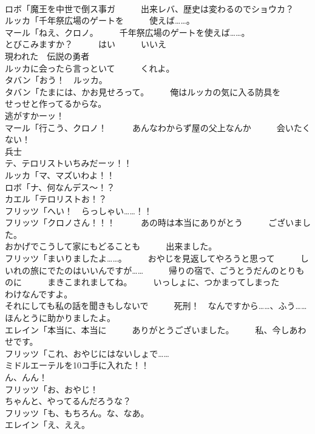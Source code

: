 \documentclass[8pt]{extreport}
\begin{document}
\begin{CJK}{UTF8}{min}
\\	ロボ「魔王を中世で倒ス事ガ　　　出来レバ、歴史は変わるのでショウカ？	
\\	ルッカ「千年祭広場のゲートを　　　使えば……。	
\\	マール「ねえ、クロノ。　　　千年祭広場のゲートを使えば……。	
\\	とびこみますか？　　　はい　　　いいえ	
\\	現われた　伝説の勇者	
\\	ルッカに会ったら言っといて　　　くれよ。	
\\	タバン「おう！　ルッカ。	
\\	タバン「たまには、かお見せろって。　　　俺はルッカの気に入る防具を　　　せっせと作ってるからな。	
\\	逃がすかーッ！	
\\	マール「行こう、クロノ！　　　あんなわからず屋の父上なんか　　　会いたくない！	
\\	兵士
\\	テ、テロリストいちみだーッ！！	
\\	ルッカ「マ、マズいわよ！！	
\\	ロボ「ナ、何なんデス～！？	
\\	カエル「テロリストお！？	
\\	フリッツ「へい！　らっしゃい……！！	
\\	フリッツ「クロノさん！！！　　　あの時は本当にありがとう　　　ございました。	
\\	おかげでこうして家にもどることも　　　出来ました。	
\\	フリッツ「まいりましたよ……。　　　おやじを見返してやろうと思って　　　しいれの旅にでたのはいいんですが……　　　帰りの宿で、ごうとうだんのとりものに　　　まきこまれましてね。　　　いっしょに、つかまってしまった　　　わけなんですよ。	
\\	それにしても私の話を聞きもしないで　　　死刑！　なんですから……、ふう……　　　ほんとうに助かりましたよ。	
\\	エレイン「本当に、本当に　　　ありがとうございました。　　　私、今しあわせです。	
\\	フリッツ「これ、おやじにはないしょで……	
\\	ミドルエーテルを10コ手に入れた！！	
\\	ん、んん！	
\\	フリッツ「お、おやじ！	
\\	ちゃんと、やってるんだろうな？	
\\	フリッツ「も、もちろん。な、なあ。	
\\	エレイン「え、ええ。	

\end{CJK}
\end{document}
